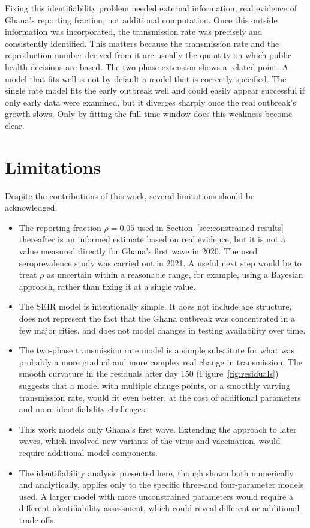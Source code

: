 \documentclass[journal]{IEEEtran}
\begin{document}
Fixing this identifiability problem needed external information, real evidence of Ghana's reporting fraction, not additional computation. Once this outside information was incorporated, the transmission rate was precisely and consistently identified. This matters because the transmission rate and the reproduction number derived from it are usually the quantity on which public health decisions are based. The two phase extension shows a related point. A model that fits well is not by default a model that is correctly specified. The single rate model fits the early outbreak well and could easily appear successful if only early data were examined, but it diverges sharply once the real outbreak's growth slows. Only by fitting the full time window does this weakness become clear.

\section{Limitations}

Despite the contributions of this work, several limitations should be acknowledged. 

\begin{itemize}
    \item The reporting fraction $\rho = 0.05$ used in Section~\ref{sec:constrained-results} thereafter is an informed estimate based on real evidence, but it is not a value measured directly for Ghana's first wave in 2020. The used seroprevalence study was carried out in 2021. A useful next step would be to treat $\rho$ as uncertain within a reasonable range, for example, using a Bayesian approach, rather than fixing it at a single value.

    \item  The SEIR model is intentionally simple. It does not include age structure, does not represent the fact that the Ghana outbreak was concentrated in a few major cities, and does not model changes in testing availability over time.

    \item The two-phase transmission rate model is a simple substitute for what was probably a more gradual and more complex real change in transmission. The smooth curvature in the residuals after day 150 (Figure~\ref{fig:residuals}) suggests that a model with multiple change points, or a smoothly varying transmission rate, would fit even better, at the cost of additional parameters and more identifiability challenges.

    \item This work models only Ghana's first wave. Extending the approach to later waves, which involved new variants of the virus and vaccination, would require additional model components.

    \item The identifiability analysis presented here, though shown both numerically and analytically, applies only to the specific three-and four-parameter models used. A larger model with more unconstrained parameters would require a different identifiability assessment, which could reveal different or additional trade-offs.
\end{itemize}  
\end{document}
